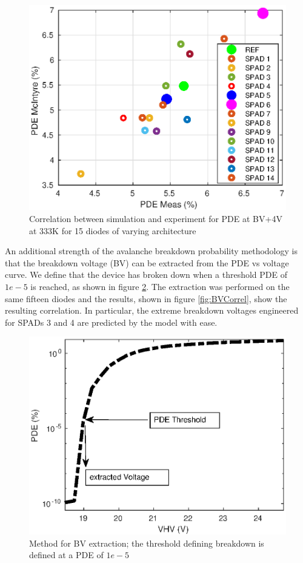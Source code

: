 \documentclass[10pt,a4paper,twocolumn]{article}
\begin{document}
\begin{figure}[h]
\centering
\includegraphics[scale=0.65]{../pictures/000_McIntyre_Bench_GR5_graphs_corel.eps}
\caption{Correlation between simulation and experiment for PDE at BV+4V at 333K for 15 diodes of varying architecture}
\label{fig:PDEcorrel}
\end{figure}

An additional strength of the avalanche breakdown probability methodology is that the breakdown voltage (BV) can be extracted from the PDE vs voltage curve. We define that the device has broken down when a threshold PDE of $1e-5$ is reached, as shown in figure \ref{fig:BVExtract}. The extraction was performed on the same fifteen diodes and the results, shown in figure \ref{fig:BVCorrel}, show the resulting correlation. In particular, the extreme breakdown voltages engineered for SPADs 3 and 4 are predicted by the model with ease. 

\begin{figure}[h!]
\centering
\includegraphics[scale=0.65]{../pictures/000_McIntyre_Bench_Method.eps}
\caption{Method for BV extraction; the threshold defining breakdown is defined at a PDE of $1e-5$}
\label{fig:BVExtract}
\end{figure}
\end{document}
